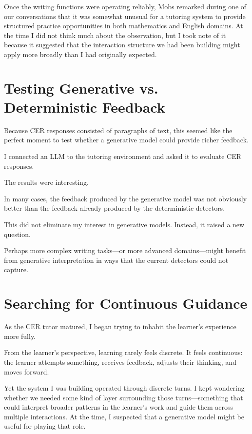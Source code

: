 \documentclass[11pt]{article}
\begin{document}
Once the writing functions were operating reliably, Mobs remarked during one of our conversations that it was somewhat unusual for a tutoring system to provide structured practice opportunities in both mathematics and English domains. At the time I did not think much about the observation, but I took note of it because it suggested that the interaction structure we had been building might apply more broadly than I had originally expected.


\section{Testing Generative vs. Deterministic Feedback}

Because CER responses consisted of paragraphs of text, this seemed like the perfect moment to test whether a generative model could provide richer feedback.

I connected an LLM to the tutoring environment and asked it to evaluate CER responses.

The results were interesting.

In many cases, the feedback produced by the generative model was not obviously better than the feedback already produced by the deterministic detectors.

This did not eliminate my interest in generative models. Instead, it raised a new question.

Perhaps more complex writing tasks—or more advanced domains—might benefit from generative interpretation in ways that the current detectors could not capture.


\section{Searching for Continuous Guidance}

As the CER tutor matured, I began trying to inhabit the learner’s experience more fully.

From the learner’s perspective, learning rarely feels discrete. It feels continuous: the learner attempts something, receives feedback, adjusts their thinking, and moves forward.

Yet the system I was building operated through discrete turns. I kept wondering whether we needed some kind of layer surrounding those turns—something that could interpret broader patterns in the learner’s work and guide them across multiple interactions. At the time, I suspected that a generative model might be useful for playing that role.
\end{document}
